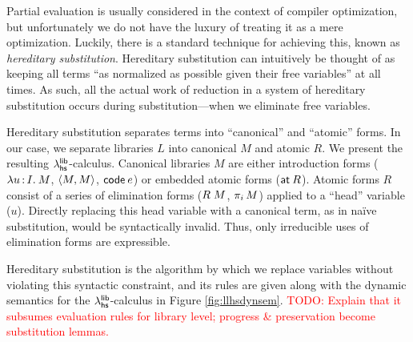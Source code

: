 \documentclass[11pt]{article}
\newcommand{\todo}[1]{\textcolor{red}{\small TODO: #1}}
\begin{document}


Partial evaluation is usually considered in the context of compiler
optimization, but unfortunately we do not have the luxury of treating it as a
mere optimization. Luckily, there is a standard technique for achieving this,
known as \emph{hereditary substitution}. Hereditary substitution can intuitively
be thought of as keeping all terms ``as normalized as possible given their free
variables'' at all times. As such, all the actual work of reduction in a system
of hereditary substitution occurs during substitution---when we eliminate free
variables.

Hereditary substitution separates terms into ``canonical'' and ``atomic'' forms.
In our case, we separate libraries $L$ into canonical $M$ and atomic $R$. We
present the resulting $\lambda^{\textsf{lib}}_{\textsf{hs}}$-calculus. Canonical libraries $M$ are either
introduction forms ($\lambda u \mathop{:} I .\: M$, $\left\langle M,M\right\rangle$, $\textsf{code}\:{e}$) or embedded atomic
forms ($\textsf{at}\:{R}$). Atomic forms $R$ consist of a series of elimination forms ($R
\; M$, $\pi_{i} \, M$) applied to a ``head'' variable ($u$). Directly replacing
this head variable with a canonical term, as in na\"ive substitution, would be
syntactically invalid. Thus, only irreducible uses of elimination forms are
expressible.

Hereditary substitution is the algorithm by which we replace variables without
violating this syntactic constraint, and its rules are given along with the
dynamic semantics for the $\lambda^{\textsf{lib}}_{\textsf{hs}}$-calculus in Figure \ref{fig:llhsdynsem}.
\todo{Explain that it subsumes evaluation rules for library level; progress \&
  preservation become substitution lemmas.}
\end{document}
